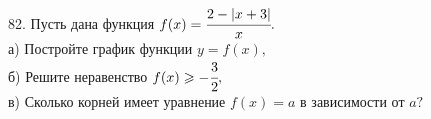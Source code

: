 82. Пусть дана функция $f(x)=\cfrac{2-|x+3|}{x}.$\\
а) Постройте график функции $y=f(x),$\\
б) Решите неравенство $f(x)\geqslant-\cfrac{3}{2},$\\
в) Сколько корней имеет уравнение $f(x)=a$ в зависимости от $a?$\\
